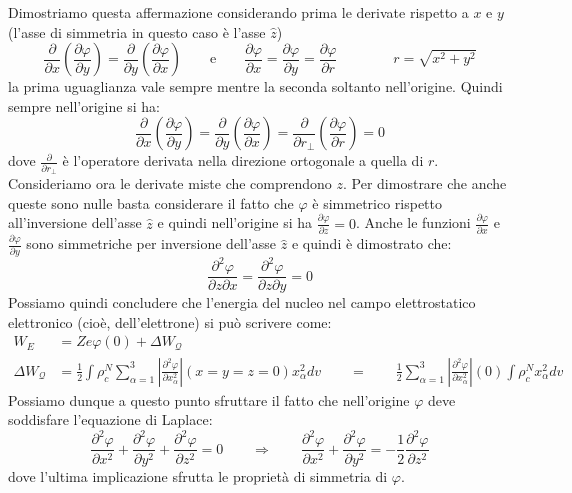 Dimostriamo questa affermazione considerando prima le derivate rispetto a $x$ e
$y$ (l'asse di simmetria in questo caso è l'asse $\hat{z}$)
\begin{equation}
\frac{\partial}{\partial x} \left( \frac{\partial \varphi}{\partial y} \right) = \frac{\partial}{\partial y} \left( \frac{\partial \varphi}{\partial x} \right) \qquad \text{e} \qquad \frac{\partial \varphi}{\partial x} = \frac{\partial \varphi}{\partial y} = \frac{\partial \varphi}{\partial r} \qquad \qquad r = \sqrt{x^2 + y^2}
\end{equation}
la prima uguaglianza vale sempre mentre la seconda soltanto nell'origine. Quindi sempre nell'origine si ha:
\begin{equation}
\frac{\partial}{\partial x} \left( \frac{\partial \varphi}{\partial y} \right) = \frac{\partial}{\partial y} \left( \frac{\partial \varphi}{\partial x} \right) = \frac{\partial}{\partial r_{\perp}} \left( \frac{\partial \varphi}{\partial r} \right) = 0
\end{equation}
dove $\frac{\partial}{\partial r_{\perp}}$ è l'operatore derivata nella
direzione ortogonale a quella di $r$. Consideriamo ora le derivate miste che
comprendono $z$. Per dimostrare che anche queste sono nulle basta considerare il
fatto che $\varphi$ è simmetrico rispetto all'inversione dell'asse $\hat{z}$ e
quindi nell'origine si ha $\frac{\partial \varphi}{\partial z} = 0$. Anche le
funzioni $\frac{\partial \varphi}{\partial x}$ e $\frac{\partial
\varphi}{\partial y}$ sono simmetriche per inversione dell'asse $\hat{z}$ e
quindi è dimostrato che:
\begin{equation}
\frac{\partial^2 \varphi}{\partial z \partial x} = \frac{\partial^2 \varphi}{\partial z \partial y} = 0
\end{equation}
Possiamo quindi concludere che l'energia del nucleo nel campo elettrostatico
elettronico (cioè, dell'elettrone) si può scrivere come:
\begin{equation}
\begin{split}
W_E &= Z e \varphi{(0)} + \Delta W_{\mathcal{Q}}\\
\Delta W_{\mathcal{Q}} &= \frac{1}{2} \int \rho_c^N \sum_{\alpha = 1}^3 \left| \frac{\partial^2 \varphi}{\partial x_{\alpha}^2} \right|{(x=y=z=0)}  x_{\alpha}^2 dv \qquad = \qquad \frac{1}{2} \sum_{\alpha=1}^3 \left| \frac{\partial^2 \varphi}{\partial x_{\alpha}^2} \right|{(0)} \int \rho_c^N  x_{\alpha}^2 dv
\end{split}
\end{equation}
Possiamo dunque a questo punto sfruttare il fatto che nell'origine $\varphi$
deve soddisfare l'equazione di Laplace:
\begin{equation}
\frac{\partial^2 \varphi}{\partial x^2} + \frac{\partial^2 \varphi}{\partial y^2} + \frac{\partial^2 \varphi}{\partial z^2} = 0 \qquad \Rightarrow \qquad \frac{\partial^2 \varphi}{\partial x^2} + \frac{\partial^2 \varphi}{\partial y^2} = -\frac{1}{2} \frac{\partial^2 \varphi}{\partial z^2}
\end{equation}
dove l'ultima implicazione sfrutta le proprietà di simmetria di $\varphi$.

